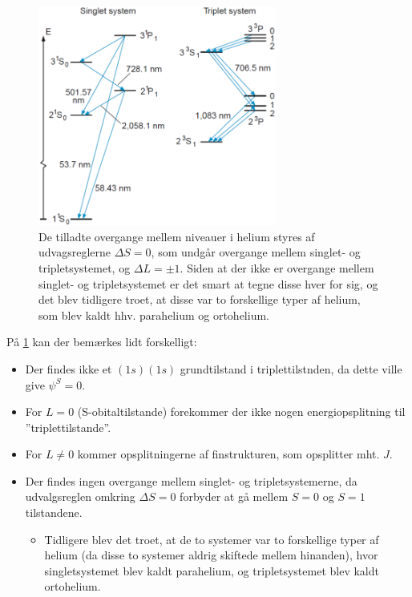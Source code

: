 \begin{figure}[!h]
    \centering
    \includegraphics[width=0.7\textwidth]{Q11/images/SingletOgtripletTilstandeIHelium.PNG}
    \caption{De tilladte overgange mellem niveauer i helium styres af udvagsreglerne $\Delta S = 0$, som undgår overgange mellem singlet- og tripletsystemet, og $\Delta L = \pm 1$. Siden at der ikke er overgange mellem singlet- og tripletsystemet er det smart at tegne disse hver for sig, og det blev tidligere troet, at disse var to forskellige typer af helium, som blev kaldt hhv. parahelium og ortohelium.}
    \label{fig:Q11_SingletOgTripletTilstandeIHelium}
\end{figure}

På \cref{fig:Q11_SingletOgTripletTilstandeIHelium} kan der bemærkes lidt forskelligt:
\begin{itemize}
    \item Der findes ikke et $(1s)(1s)$ grundtilstand i triplettilstnden, da dette ville give $\psi^S = 0$.
    \item For $L = 0$ (S-obitaltilstande) forekommer der ikke nogen energiopsplitning til ''triplettilstande''.
    \item For $L \ne 0$ kommer opsplitningerne af finstrukturen, som opsplitter mht. $J$.
    \item Der findes ingen overgange mellem singlet- og tripletsystemerne, da udvalgsreglen omkring $\Delta S = 0$ forbyder at gå mellem $S = 0$ og $S = 1$ tilstandene.
    \begin{itemize}
        \item Tidligere blev det troet, at de to systemer var to forskellige typer af helium (da disse to systemer aldrig skiftede mellem hinanden), hvor singletsystemet blev kaldt \textsf{parahelium}, og tripletsystemet blev kaldt \textsf{ortohelium}.
    \end{itemize}
\end{itemize}